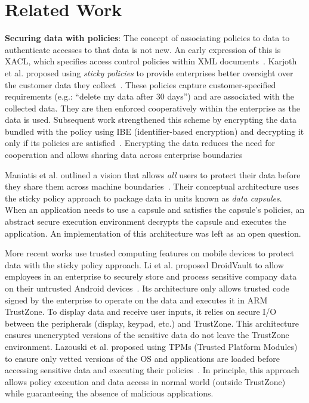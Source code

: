 \chapter{Related Work}
\label{sec:related}

\textbf{Securing data with policies}: The concept of associating policies to
data to authenticate accesses to that data is not new. An early expression of
this is XACL, which specifies access control policies within XML
documents~\cite{xacl}. Karjoth et al. proposed using {\em sticky policies} to
provide enterprises better oversight over the customer data they
collect~\cite{karjoth02enterprise}. These policies capture customer-specified
requirements (e.g.: ``delete my data after 30 days'') and are associated with
the collected data. They are then enforced cooperatively within the enterprise
as the data is used. Subsequent work strengthened this scheme by encrypting the
data bundled with the policy using IBE (identifier-based encryption) and
decrypting it only if its policies are satisfied~\cite{mont03stickypolicies,
pearson11stickypolicies}. Encrypting the data reduces the need for cooperation
and allows sharing data across enterprise boundaries

Maniatis et al. outlined a vision that allows {\em all} users to protect their
data before they share them across machine boundaries~\cite{datacapsules}. Their
conceptual architecture uses the sticky policy approach to package data in units
known as {\em data capsules}. When an application needs to use a capsule and
satisfies the capsule's policies, an abstract secure execution environment
decrypts the capsule and executes the application. An implementation of this
architecture was left as an open question.

More recent works use trusted computing features on mobile devices to protect
data with the sticky policy approach. Li et al. proposed DroidVault to allow
employees in an enterprise to securely store and process sensitive company data
on their untrusted Android devices~\cite{li14droidvault}. Its architecture only
allows trusted code signed by the enterprise to operate on the data and executes
it in ARM TrustZone.  To display data and receive user inputs, it relies on
secure I/O between the peripherals (display, keypad, etc.) and TrustZone. This
architecture ensures unencrypted versions of the sensitive data do not leave the
TrustZone environment. Lazouski et al. proposed using TPMs (Trusted Platform
Modules) to ensure only vetted versions of the OS and applications are loaded
before accessing sensitive data and executing their
policies~\cite{lazouski14stateful}. In principle, this approach allows policy
execution and data access in normal world (outside TrustZone) while guaranteeing
the absence of malicious applications.

